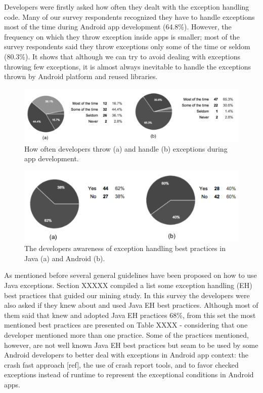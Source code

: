
Developers were firstly asked how often they dealt with the exception handling code. Many of our survey respondents recognized they have to handle exceptions most of the time during Android app development (64.8\%). However, the frequency on which they throw exception inside apps is smaller; most of the survey respondents said they throw exceptions only some of the time or seldom (80.3\%). It shows that although we can try to avoid dealing with exceptions throwing few exceptions, it is almost always inevitable to handle the exceptions thrown by Android platform and reused libraries. 

\begin{figure} \centering \includegraphics[scale=0.35]{charts/often.png}
\caption{How often developers throw (a) and handle (b) exceptions during app development.}
\label{fig:oftenhandle}
\end{figure}


\begin{figure} \centering \includegraphics[scale=0.35]{charts/bestpractices.png}
\caption{The developers awareness of exception handling best practices in Java (a) and Android (b). }
\label{fig:oftenhandle}
\end{figure}

\bigskip

As mentioned before several general guidelines have been proposed on how to
use Java exceptions. Section XXXXX compiled a list some exception handling (EH) best practices that guided our mining study. In this survey the developers were also asked if they knew about and used Java EH best practices. Although most of them said that knew and adopted Java EH practices 68\%, from this set the most mentioned best practices are presented on Table XXXX - considering that one developer mentioned more than one practice. Some of the practices mentioned, however, are not well known Java EH best practices but seam to be used by some Android developers to better deal with exceptions in Android app context: the crash fast approach [ref], the use of crash report tools, and to favor checked exceptions instead of runtime to represent the exceptional conditions in Android apps.				
	
